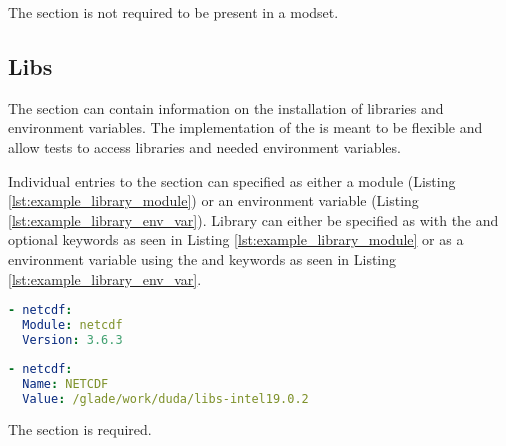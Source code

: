 The \mpi section is not required to be present in a modset.

\subsection{Libs}
\label{subsec:modset_libs}

The \libs section can contain information on the installation of libraries and
environment variables. The implementation of the \libs is meant to be flexible
and allow tests to access libraries and needed environment variables.

Individual entries to the \libs section can specified as either a module
(Listing \ref{lst:example_library_module}) or an environment variable (Listing
\ref{lst:example_library_env_var}). Library can either be specified as with
the \module and optional \version keywords as seen in Listing
\ref{lst:example_library_module} or as a environment variable using the \name
and  keywords as seen in Listing \ref{lst:example_library_env_var}.

\begin{lstlisting}[language=yaml, 
                   caption={Example Library Module},
                   label={lst:example_library_module}]
- netcdf:
  Module: netcdf
  Version: 3.6.3
\end{lstlisting}

\begin{lstlisting}[language=yaml, 
                   caption={Example Library Environment Variable},
                   label={lst:example_library_env_var}]
- netcdf:
  Name: NETCDF
  Value: /glade/work/duda/libs-intel19.0.2
\end{lstlisting}

The \libs section is required.
